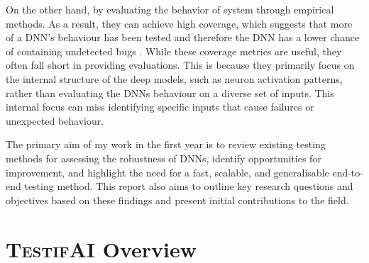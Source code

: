 On the other hand,  by evaluating the behavior of system through empirical methods. As a result, they can achieve high coverage, which suggests that more of a DNN's behaviour has been tested and therefore the DNN has a lower chance of containing undetected bugs \cite{HuangX}. While these coverage metrics are useful, they often fall short in providing \hyperref[gloss]{}\label{comprehensive} evaluations. This is because they primarily focus on the internal structure of the deep models, such as neuron activation patterns, rather than evaluating the DNNs behaviour on a diverse set of inputs. This internal focus can miss identifying specific inputs that cause failures or unexpected behaviour.


\begin{tcolorbox}[colback=purple!2!white, colframe=purple,title= 10\textsuperscript{th} Month Report Goal]

    The primary aim of my work in the first year is to review existing testing methods for assessing the robustness of DNNs, identify opportunities for improvement, and highlight the need for a fast, scalable, and generalisable end-to-end testing method. This report also aims to outline key research questions and objectives based on these findings and present initial contributions to the field.

\end{tcolorbox}
    



\section{\textsc{TestifAI} Overview}

